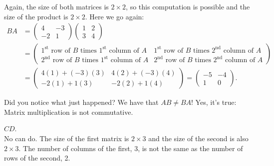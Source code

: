\documentclass[12pt]{article}
\def\it{\item}
\def\lp{\left(} \def\rp{\right)} \def\abs#1{\vert #1 \vert}
\begin{document}
Again, the size of both matrices is $2 \times 2$, so this computation is possible and the size of the product is $2 \times 2$. Here we go again:
\begin{align*}
BA &= \lp \begin{array}{rr} 4 & -3 \\ -2 & 1 \end{array} \rp \begin{pmatrix} 1 & 2 \\ 3 & 4 \end{pmatrix} \\[.1in]
&=
\begin{pmatrix} \mbox{$1^{\text{st}}$ row of $B$ times $1^{\text{st}}$ column of $A$} & \mbox{$1^{\text{st}}$ row of $B$ times $2^{\text{nd}}$ column of $A$} \\
\mbox{$2^{\text{nd}}$ row of $B$ times $1^{\text{st}}$ column of $A$} & \mbox{$2^{\text{nd}}$ row of $B$ times $2^{\text{nd}}$ column of $A$} \end{pmatrix} \\[.1in]
&=
\begin{pmatrix} 4(1)+(-3)(3) & 4(2)+(-3)(4) \\ -2(1)+1(3) & -2(2)+1(4) \end{pmatrix} =\lp \begin{array}{rr} -5 & -4 \\ 1 & 0 \end{array} \rp.
\end{align*}

Did you notice what just happened? We have that $AB \not= BA$! Yes, it's true: Matrix multiplication is not commutative.

\it $CD$. \\
No can do. The size of the first matrix is $2 \times 3$ and the size of the second is also $2 \times 3$. The number of columns of the first, 3, is not the same as the number of rows of the second, 2.
\end{document}
